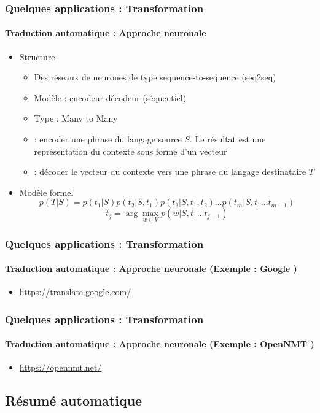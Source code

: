 \documentclass[xcolor=table]{beamer}
\begin{document}
\begin{frame}
	\frametitle{Quelques applications : Transformation}
	\framesubtitle{Traduction automatique : Approche neuronale}
	\begin{itemize}
		\item Structure
		\begin{itemize}
			\item Des réseaux de neurones de type sequence-to-sequence (seq2seq)
			\item Modèle : encodeur-décodeur (séquentiel)
			\item Type : Many to Many 
			\item {} : encoder une phrase du langage source $S$. Le résultat est une représentation du contexte sous forme d'un vecteur
			\item {} : décoder le vecteur du contexte vers une phrase du langage destinataire $T$
		\end{itemize}
	
		\item Modèle formel 
		\[ p(T|S) = p(t_1|S) p(t_2|S, t_1) p(t_3|S, t_1, t_2)\ldots p(t_m|S, t_1\ldots t_{m-1}) \]
		\[\hat{t}_j = \arg\max_{w \in V} p(w | S, t_1\ldots t_{j-1})\]
	\end{itemize}
\end{frame}

\begin{frame}
	\frametitle{Quelques applications : Transformation}
	\framesubtitle{Traduction automatique : Approche neuronale (Exemple : Google \cite{16-wu-al} )}
	\begin{itemize}
		\item \url{https://translate.google.com/}
	\end{itemize}
	\begin{center}
	\end{center}
\end{frame}

\begin{frame}
	\frametitle{Quelques applications : Transformation}
	\framesubtitle{Traduction automatique : Approche neuronale (Exemple : OpenNMT \cite{17-klein-al})}
	\begin{itemize}
		\item \url{https://opennmt.net/}
	\end{itemize}
\end{frame}

\subsection{Résumé automatique}
\end{document}
